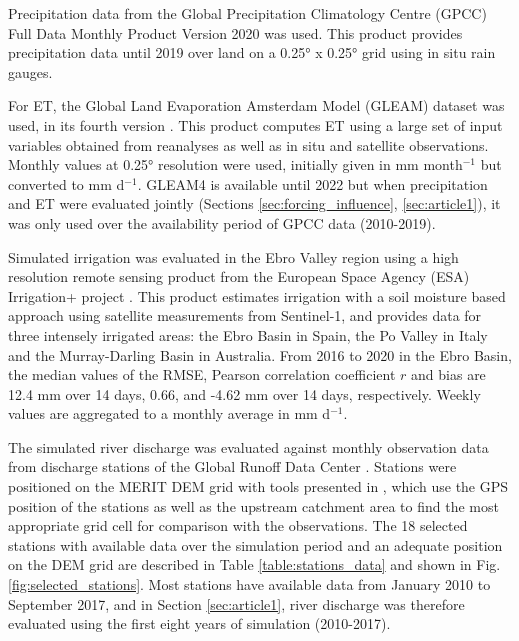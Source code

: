 Precipitation data from the Global Precipitation Climatology Centre (GPCC) Full Data Monthly Product Version 2020 \citep{gpcc_v2020} was used. This product provides precipitation data until 2019 over land on a 0.25° x 0.25° grid using in situ rain gauges. 

For ET, the Global Land Evaporation Amsterdam Model (GLEAM) dataset was used, in its fourth version \citep{miralles_gleam4_2025}. This product computes ET using a large set of input variables obtained from reanalyses as well as in situ and satellite observations. Monthly values at 0.25° resolution were used, initially given in mm month$^{-1}$ but converted to mm d$^{-1}$. GLEAM4 is available until 2022 but when precipitation and ET were evaluated jointly (Sections \ref{sec:forcing_influence}, \ref{sec:article1}), it was only used over the availability period of GPCC data (2010-2019).

Simulated irrigation was evaluated in the Ebro Valley region using a high resolution remote sensing product from the European Space Agency (ESA) Irrigation+ project \citep{dari_regional_2023}. This product estimates irrigation with a soil moisture based approach using satellite measurements from Sentinel-1, and provides data for three intensely irrigated areas: the Ebro Basin in Spain, the Po Valley in Italy and the Murray-Darling Basin in Australia. From 2016 to 2020 in the Ebro Basin, the median values of the RMSE, Pearson correlation coefficient $r$ and bias are 12.4 mm over 14 days, 0.66, and -4.62 mm over 14 days, respectively. Weekly values are aggregated to a monthly average in mm d$^{-1}$. 

\hfill

The simulated river discharge was evaluated against monthly observation data from discharge stations of the Global Runoff Data Center \citep[GRDC, https://grdc.bafg.de,][]{fekete_global_2003}.
Stations were positioned on the MERIT DEM grid with tools presented in \cite{polcher_hydrological_2023}, which use the GPS position of the stations as well as the upstream catchment area to find the most appropriate grid cell for comparison with the observations. 
The 18 selected stations with available data over the simulation period and an adequate position on the DEM grid are described in Table \ref{table:stations_data} and shown in Fig. \ref{fig:selected_stations}. Most stations have available data from January 2010 to September 2017, and in Section \ref{sec:article1}, river discharge was therefore evaluated using the first eight years of simulation (2010-2017).

